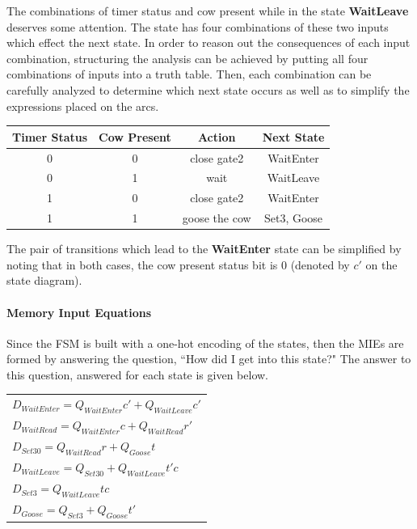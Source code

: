 The combinations of timer status and cow present while in the
state \textbf{ WaitLeave} deserves some attention. The state has four
combinations of these two inputs which effect the next state.
In order to reason out the consequences of each input
combination, structuring the analysis can be achieved by putting all
four combinations of inputs into a truth
table.  Then, each combination can be carefully analyzed to
determine which next state occurs as well as to simplify the
expressions placed on the arcs.

\begin{table}
    \begin{tabular}{c|c||c|c}
        Timer Status     & Cow Present     & Action        & Next State    \\ \hline \hline
        0            & 0            & close gate2    & WaitEnter        \\ \hline
        0            & 1            & wait        & WaitLeave        \\ \hline
        1            & 0            & close gate2    & WaitEnter        \\ \hline
        1            & 1            & goose the cow    & Set3, Goose        \\
    \end{tabular}
\end{table}

The pair of transitions which lead to the \textbf{ WaitEnter} state can be
simplified by noting that in both cases, the cow present status
bit is 0 (denoted by $c'$ on the state diagram).

\paragraph{Memory Input Equations}
Since the FSM is built with a one-hot encoding of the states,
then the MIEs are formed by answering the question, ``How did
I get into this state?"  The answer to this question, answered
for each state is given below.

\begin{tabular}{l}
    $D_{WaitEnter}    = Q_{WaitEnter}c' + Q_{WaitLeave}c'$  \\
    $D_{WaitRead}    = Q_{WaitEnter}c + Q_{WaitRead}r'$ \\
    $D_{Set30}    = Q_{WaitRead}r + Q_{Goose}t$ \\
    $D_{WaitLeave}    = Q_{Set30} + Q_{WaitLeave}t'c$ \\
    $D_{Set3}    = Q_{WaitLeave}tc$ \\
    $D_{Goose}    = Q_{Set3} +  Q_{Goose}t'$ \\
\end{tabular}


